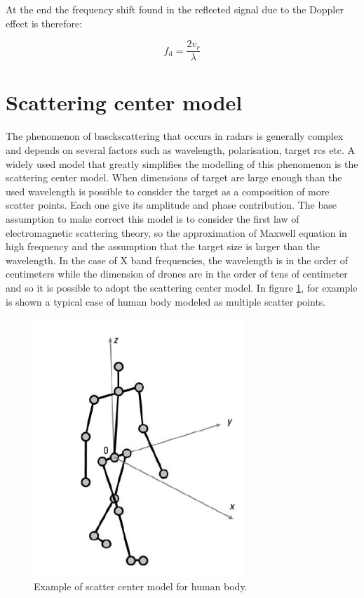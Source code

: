 At the end the frequency shift found in the reflected signal due to the Doppler effect is therefore:

\begin{equation}
f_{\mathrm{d}}=\frac{2 v_{r}}{\lambda}
\end{equation}


\section{Scattering center model}
The phenomenon of basckscattering that occurs in radars is generally complex and depends on several factors such as wavelength, polarisation, target rcs etc. A widely used model that greatly simplifies the modelling of this phenomenon is the scattering center model. When dimensions of target are large enough than the used wavelength is possible to consider the target as a composition of more scatter points. Each one give its amplitude and phase contribution. The base assumption to make correct this model is to consider the first law of electromagnetic scattering theory, so the approximation of Maxwell equation in high frequency and the assumption that the target size is larger than the wavelength. In the case of X band frequencies, the wavelength is in the order of centimeters while the dimension of drones are in the order of tens of centimeter and so it is possible to adopt the scattering center model. In figure \ref{Humanscatterbody}, for example is shown a typical case of human body modeled as multiple scatter points. 



\begin{figure}[h!]
    \centering
    \includegraphics[width=8cm]{Time-frequency analysis-chap3/img/Scatter body model.png}
    \caption{Example of scatter center model for human body.\cite{microdoppler_chen}}
    \label{Humanscatterbody}
\end{figure}


